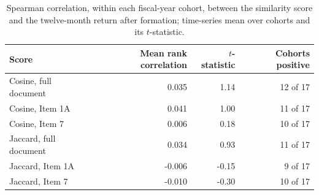 \begin{table}[htbp]\centering\small
\caption{Spearman correlation, within each fiscal-year cohort, between the similarity score and the twelve-month return after formation; time-series mean over cohorts and its $t$-statistic.}\label{tab:rankcorr}
\begin{tabular}{lrrr}\toprule
Score & Mean rank correlation & $t$-statistic & Cohorts positive \\ \midrule
Cosine, full document & 0.035 & 1.14 & 12 of 17 \\
Cosine, Item 1A & 0.041 & 1.00 & 11 of 17 \\
Cosine, Item 7 & 0.006 & 0.18 & 10 of 17 \\
Jaccard, full document & 0.034 & 0.93 & 11 of 17 \\
Jaccard, Item 1A & -0.006 & -0.15 & 9 of 17 \\
Jaccard, Item 7 & -0.010 & -0.30 & 10 of 17 \\
\bottomrule\end{tabular}\end{table}
